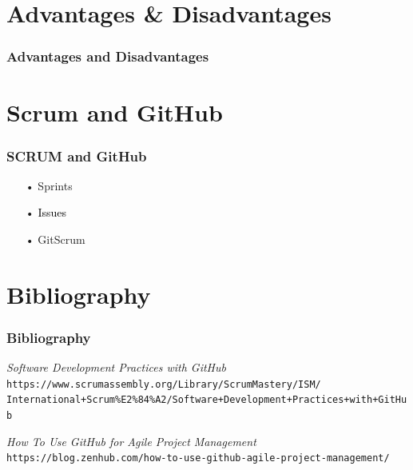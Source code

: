 \documentclass{beamer}
\begin{document}
\begin{frame}
\begin{center}
    \end{center}
    
\end{frame}



\section{Advantages \& Disadvantages}

\begin{frame}
    \frametitle{Advantages and Disadvantages}
\end{frame}



\section{Scrum and GitHub}

\begin{frame}
    \frametitle{SCRUM and GitHub}
    \begin{itemize}
    \color{gray}
    \item[•] Sprints
    \item[•] \textcolor{black}{Issues}
    \item[•] GitScrum
    \end{itemize}
\end{frame}



\section{Bibliography}

\begin{frame}
    \frametitle{Bibliography}
	\begin{thebibliography}{10}

	\textit{Software Development Practices with GitHub} \\
	\texttt{https://www.scrumassembly.org/Library/ScrumMastery/ISM/\\
	International+Scrum\%E2\%84\%A2/Software+Development+Practices+with+GitHub}

	\textit{How To Use GitHub for Agile Project Management} \\
	\texttt{https://blog.zenhub.com/how-to-use-github-agile-project-management/}
	\end{thebibliography}
\end{frame}
\end{document}
